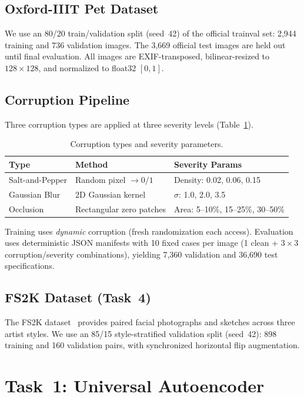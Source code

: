 \documentclass[conference]{IEEEtran}
\begin{document}
\subsection{Oxford-IIIT Pet Dataset}
We use an 80/20 train/validation split (seed~42) of the official trainval set: 2{,}944 training and 736 validation images. The 3{,}669 official test images are held out until final evaluation. All images are EXIF-transposed, bilinear-resized to $128 \times 128$, and normalized to float32 $[0,1]$.

\subsection{Corruption Pipeline}
Three corruption types are applied at three severity levels (Table~\ref{tab:corruptions}).

\begin{table}[h]
\centering
\caption{Corruption types and severity parameters.}
\label{tab:corruptions}
\begin{tabular}{@{}lll@{}}
\toprule
\textbf{Type} & \textbf{Method} & \textbf{Severity Params} \\
\midrule
Salt-and-Pepper & Random pixel $\to 0/1$ & Density: 0.02, 0.06, 0.15 \\
Gaussian Blur & 2D Gaussian kernel & $\sigma$: 1.0, 2.0, 3.5 \\
Occlusion & Rectangular zero patches & Area: 5--10\%, 15--25\%, 30--50\% \\
\bottomrule
\end{tabular}
\end{table}

Training uses \emph{dynamic} corruption (fresh randomization each access). Evaluation uses deterministic JSON manifests with 10 fixed cases per image (1 clean + $3 \times 3$ corruption/severity combinations), yielding 7{,}360 validation and 36{,}690 test specifications.

\subsection{FS2K Dataset (Task~4)}
The FS2K dataset~\cite{fan2019fs2k} provides paired facial photographs and sketches across three artist styles. We use an 85/15 style-stratified validation split (seed~42): 898 training and 160 validation pairs, with synchronized horizontal flip augmentation.

\section{Task~1: Universal Autoencoder}
\end{document}
